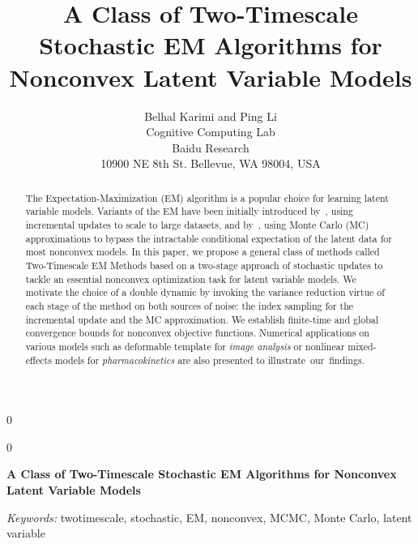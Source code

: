 \documentclass[12pt]{article}
\newcommand{\blind}{0}
\begin{document}
\def\spacingset#1{\renewcommand{\baselinestretch}%
{#1}\small\normalsize} \spacingset{1}



\blind
{
  \title{\bf A Class of Two-Timescale Stochastic EM Algorithms for Nonconvex Latent Variable Models}
  \author{Belhal Karimi and Ping Li\hspace{.2cm}\\
    Cognitive Computing Lab \\
    Baidu Research \\
    10900 NE 8th St. Bellevue, WA 98004, USA}
  \maketitle
} \fi

\blind
{
  \bigskip
  \bigskip
  \bigskip
  \begin{center}
    {\LARGE\bf A Class of Two-Timescale Stochastic EM Algorithms for Nonconvex Latent Variable Models}
\end{center}
  \medskip
} \fi

\bigskip
\begin{abstract}
The Expectation-Maximization (EM) algorithm is a popular choice for learning latent variable models. 
Variants of the EM have been initially introduced by~\citet{neal1998view}, using incremental updates to scale to large datasets, and by~\citet{wei1990monte, delyon1999}, using Monte Carlo (MC) approximations to bypass the intractable conditional expectation of the latent data for most nonconvex models.
In this paper, we propose a general class of methods called Two-Timescale EM Methods based on a two-stage approach of stochastic updates to tackle an essential nonconvex optimization task for latent variable models.
We motivate the choice of a double dynamic by invoking the variance reduction virtue of each stage of the method on both sources of noise: the index sampling for the incremental update and the MC approximation.
We establish finite-time and global convergence bounds for nonconvex objective functions.
Numerical applications on various models such as deformable template for \emph{image analysis} or nonlinear mixed-effects models for \emph{pharmacokinetics} are also presented to illustrate~our~findings.
\end{abstract}

\noindent%
{\it Keywords:}  twotimescale, stochastic, EM, nonconvex, MCMC, Monte Carlo, latent variable
\end{document}
